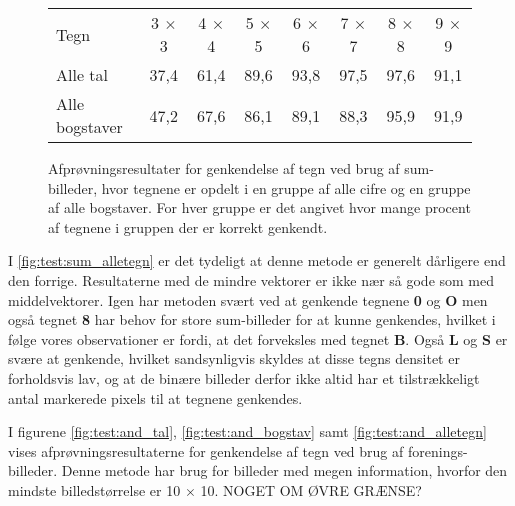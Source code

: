\begin{figure}[htp]
\centering
\begin{tabular}{|l|c|c|c|c|c|c|c|}\hline
\rowcolor[gray]{0.9} \multicolumn{8}{|>{\columncolor[gray]{0.9}}c|}{\textbf{Sum-billeder}} \\ \hline
Tegn & 3 $\times$ 3 & 4 $\times$ 4 & 5 $\times$ 5 & 6 $\times$ 6 & 7 $\times$ 7 & 8 $\times$ 8 & 9 $\times$ 9 \\\hline
Alle tal & 37,4 & 61,4 & 89,6 & 93,8 & 97,5 & 97,6 & 91,1\\\hline
Alle bogstaver & 47,2 & 67,6 & 86,1 & 89,1 & 88,3 & 95,9 & 91,9\\\hline
\end{tabular}
\caption{Afprøvningsresultater for genkendelse af tegn ved brug af sum-billeder, hvor tegnene er opdelt i en gruppe af alle cifre og en gruppe af alle bogstaver. For hver gruppe er det angivet hvor mange procent af tegnene i gruppen der er korrekt genkendt.}
\label{fig:test:sum_alletegn}
\end{figure}


I \vref{fig:test:sum_alletegn} er det tydeligt at denne metode er generelt dårligere end den forrige. Resultaterne med de mindre vektorer er ikke nær så gode som med middelvektorer. Igen har metoden svært ved at genkende tegnene \textbf{0} og \textbf{O} men også tegnet \textbf{8} har behov for store sum-billeder for at kunne genkendes, hvilket i følge vores observationer er fordi, at det forveksles med tegnet \textbf{B}. Også \textbf{L} og \textbf{S} er svære at genkende, hvilket sandsynligvis skyldes at disse tegns densitet er forholdsvis lav, og at de binære billeder derfor ikke altid har et tilstrækkeligt antal markerede pixels til at tegnene genkendes.

I figurene \vref{fig:test:and_tal}, \vref{fig:test:and_bogstav} samt \vref{fig:test:and_alletegn} vises afprøvningsresultaterne for genkendelse af tegn ved brug af forenings-billeder. Denne metode har brug for billeder med megen information, hvorfor den mindste billedstørrelse er 10 $\times$ 10. NOGET OM ØVRE GRÆNSE?

